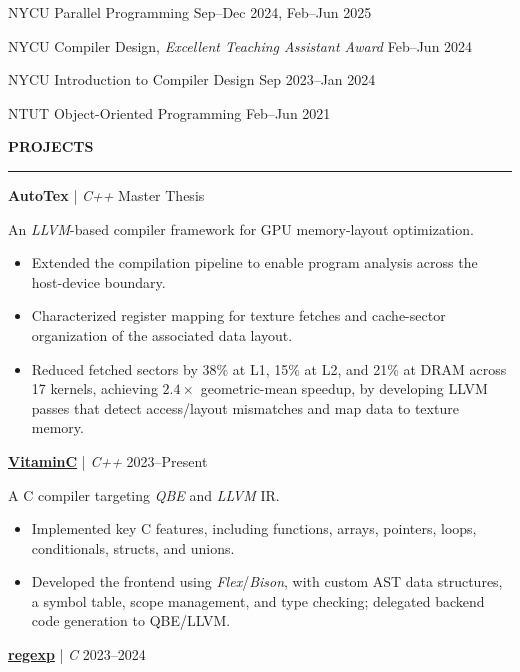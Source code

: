 \documentclass[11pt]{article}
\newcommand{\resumesection}[1]{%
    \vspace{8pt}
    \noindent\textbf{\large #1}\par
    \vspace{4pt}
    \hrule
    \vspace{6pt}
}
\begin{document}
NYCU Parallel Programming \hfill Sep--Dec 2024, Feb--Jun 2025

NYCU Compiler Design, \textit{Excellent Teaching Assistant Award} \hfill Feb--Jun 2024

NYCU Introduction to Compiler Design \hfill Sep 2023--Jan 2024

NTUT Object-Oriented Programming \hfill Feb--Jun 2021

\resumesection{PROJECTS}

\textbf{AutoTex} | \textit{C++} \hfill Master Thesis

An \textit{LLVM}-based compiler framework for GPU memory-layout optimization.

\begin{itemize}[noitemsep, topsep=0pt, partopsep=0pt, parsep=0pt, leftmargin=*]
    \item Extended the compilation pipeline to enable program analysis across the host-device boundary.
    \item Characterized register mapping for texture fetches and cache-sector organization of the associated data layout.
    \item Reduced fetched sectors by 38\% at L1, 15\% at L2, and 21\% at DRAM across 17 kernels, achieving \(2.4\times\) geometric-mean speedup, by developing LLVM passes that detect access/layout mismatches and map data to texture memory.
\end{itemize}

\vspace{6pt}

\textbf{\href{https://github.com/Lai-YT/vitaminc}{VitaminC}} | \textit{C++} \hfill 2023--Present

A C compiler targeting \textit{QBE} and \textit{LLVM} IR.
\begin{itemize}[noitemsep, topsep=0pt, partopsep=0pt, parsep=0pt, leftmargin=*]
    \item Implemented key C features, including functions, arrays, pointers, loops, conditionals, structs, and unions.
    \item Developed the frontend using \textit{Flex}/\textit{Bison}, with custom AST data structures, a symbol table, scope management, and type checking; delegated backend code generation to QBE/LLVM.
\end{itemize}

\vspace{6pt}

\textbf{\href{https://github.com/Lai-YT/regexp}{regexp}} | \textit{C} \hfill 2023--2024
\end{document}
